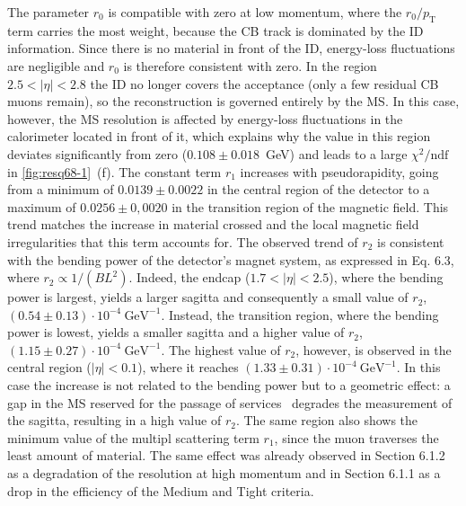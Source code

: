 \documentclass[11pt,a4paper,twoside,openright]{report}
\begin{document}
The parameter $r_0$ is compatible with zero at low momentum, where the $r_0/p_{\mathrm{T}}$ term carries the most weight, because the CB track is dominated by the ID information. Since there is no material in front of the ID, energy-loss fluctuations are negligible and $r_0$ is therefore consistent with zero. In the region $2.5<|\eta|<2.8$ the ID no longer covers the acceptance (only a few residual CB muons remain), so the reconstruction is governed entirely by the MS. In this case, however, the MS resolution is affected by energy-loss fluctuations in the calorimeter located in front of it, which explains why the value in this region deviates significantly from zero ($0.108\pm0.018$~GeV) and leads to a large $\chi^2/\mathrm{ndf}$ in \cref{fig:resq68-1}~(f). The constant term $r_1$ increases with pseudorapidity, going from a minimum of $0.0139 \pm 0.0022$ in the central region of the detector to a maximum of $0.0256\pm0,0020$ in the transition region of the magnetic field. This trend matches the increase in material crossed and the local magnetic field irregularities that this term accounts for. The observed trend of $r_2$ is consistent with the bending power of the detector's magnet system, as expressed in Eq. 6.3, where $r_2\propto1/(BL^2)$. Indeed, the endcap ($1.7<|\eta|<2.5$), where the bending power is largest, yields a larger sagitta and consequently a small value of $r_2$, $(0.54\pm0.13)\cdot10^{-4}~\text{GeV}^{-1}$. Instead, the transition region, where the bending power is lowest, yields a smaller sagitta and a higher value of $r_2$, $(1.15\pm0.27)\cdot10^{-4}~\text{GeV}^{-1}$. The highest value of $r_2$, however, is observed in the central region ($|\eta|<0.1$), where it reaches $(1.33\pm0.31)\cdot10^{-4}~\text{GeV}^{-1}$. In this case the increase is not related to the bending power but to a geometric effect: a gap in the MS reserved for the passage of services~\cite{ATLAS-MUON-EFF-2021} degrades the measurement of the sagitta, resulting in a high value of $r_2$. The same region also shows the minimum value of the multipl scattering term $r_1$, since the muon traverses the least amount of material. The same effect was already observed in Section 6.1.2 as a degradation of the resolution at high momentum and in Section 6.1.1 as a drop in the efficiency of the Medium and Tight criteria.
\end{document}
